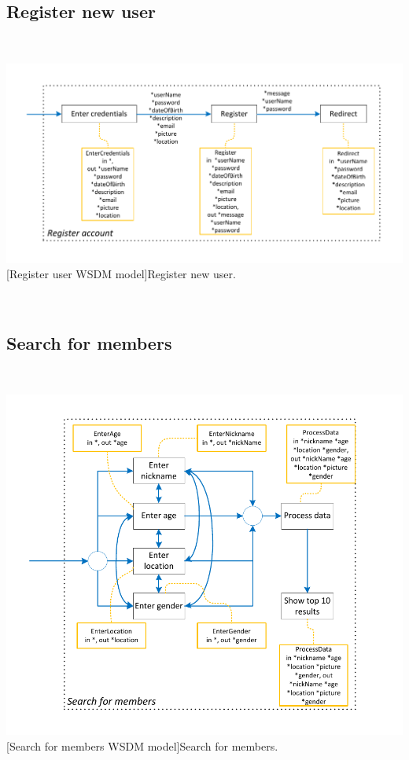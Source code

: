 \documentclass[11pt, a4paper,svglistings,oneside]{book}
\begin{document}
\subsection{Register new user}

$\;$ \\
\noindent\begin{minipage}{\textwidth}
    \centering
   \includegraphics[scale=0.8]{Nav_Register.pdf}
 [Register user WSDM model]{Register new user.}
\end{minipage}
$\;$ \\ 

\subsection{Search for members}

$\;$ \\
\noindent\begin{minipage}{\textwidth}
    \centering
   \includegraphics[scale=0.8]{Nav_SearchForMembers.pdf}
 [Search for members WSDM model]{Search for members.}
\end{minipage}
$\;$ \\ 
\end{document}
